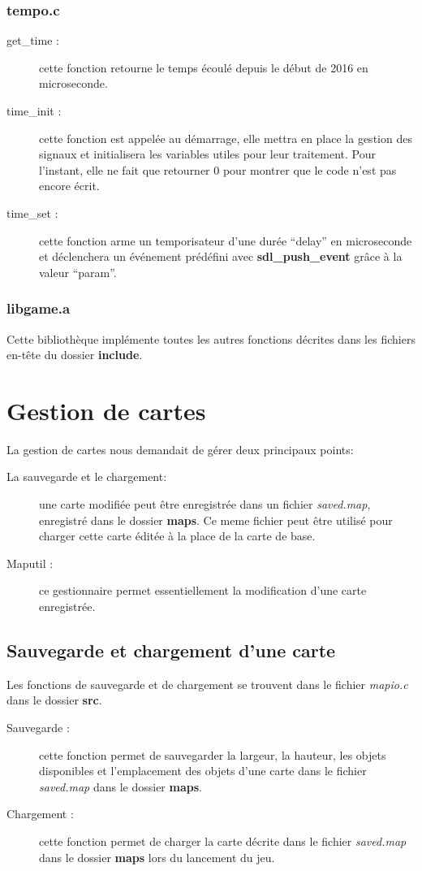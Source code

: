 \documentclass{report}
\begin{document}
\subsection{tempo.c}
\begin{description}
\item[get\_time :] cette fonction retourne le temps écoulé depuis le début de 2016 en microseconde.
\item[time\_init :] cette fonction est appelée au démarrage, elle mettra en place la gestion des signaux et initialisera les variables utiles pour leur traitement. Pour l'instant, elle ne fait que retourner 0 pour montrer que le code n'est pas encore écrit.
\item[time\_set :] cette fonction arme un temporisateur d'une durée ``delay'' en microseconde et déclenchera un événement prédéfini avec \textbf{sdl\_push\_event} grâce à la valeur ``param''.
\end{description}

\subsection{libgame.a}
Cette bibliothèque implémente toutes les autres fonctions décrites dans les fichiers en-tête du dossier \textbf{include}.


\chapter{Gestion de cartes}
\setcounter{section}{0}
La gestion de cartes nous demandait de gérer deux principaux points:
\begin{description}
\item[La sauvegarde et le chargement:] une carte modifiée peut être enregistrée dans un fichier \textit{saved.map}, enregistré dans le dossier \textbf{maps}. Ce meme fichier peut être utilisé pour charger cette carte éditée à la place de la carte de base.
\item[Maputil :] ce gestionnaire permet essentiellement la modification d'une carte enregistrée.
\end{description}

\section{Sauvegarde et chargement d'une carte}
Les fonctions de sauvegarde et de chargement se trouvent dans le fichier \textit{mapio.c} dans le dossier \textbf{src}.
\begin{description}
\item[Sauvegarde :] cette fonction permet de sauvegarder la largeur, la hauteur, les objets disponibles et l'emplacement des objets d'une carte dans le fichier \textit{saved.map} dans le dossier \textbf{maps}.
  \item[Chargement :] cette fonction permet de charger la carte décrite dans le fichier \textit{saved.map} dans le dossier \textbf{maps} lors du lancement du jeu.
\end{description}
\end{document}

